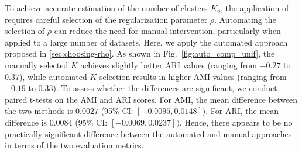 To achieve accurate estimation of the number of clusters $K_o$, the application of \methodname requires careful selection of the regularization parameter $\rho$. Automating the selection of $\rho$ can reduce the need for manual intervention, particularly when applied to a large number of datasets.
Here, we apply the automated approach proposed in \cref{sec:choosing-rho}.
%
%
%
As shown in Fig.~\ref{fig:auto_comp_unif},
the manually selected $K$ achieves slightly better ARI values
(ranging from $-0.27$ to $0.37$), while automated $K$ selection results in higher AMI values
(ranging from $-0.19$ to $0.33$).
To assess whether the differences are significant, we conduct paired t-tests on the AMI and ARI scores. For AMI, the mean
difference between the two methods is $0.0027$  (95\% CI: $[-0.0095, 0.0148])$.
For ARI, the mean difference is $0.0084$ (95\% CI: $[-0.0069, 0.0237])$.
Hence, there appears to be no practically significant difference between the automated and manual approaches in terms of the two evaluation metrics.


